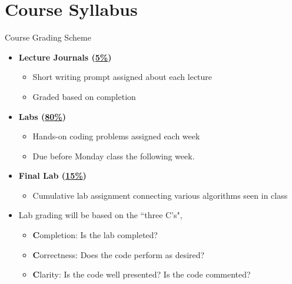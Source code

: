 {}\documentclass[letterpaper,
compress,
xcolor=x11names,
]{beamer}
\begin{document}
\section{Course Syllabus}
\begin{frame}{Course Grading Scheme}
	\footnotesize
	\begin{itemize}
		\item\textbf{Lecture Journals (\underline{5\%})}
			\begin{itemize}
				\item Short writing prompt assigned about each lecture
				\item Graded based on completion
			\end{itemize}
		\item\textbf{Labs (\underline{80\%})}
			\begin{itemize}
				\item Hands-on coding problems assigned each week
				\item Due before Monday class the following week.
			\end{itemize}
		\item\textbf{Final Lab (\underline{15\%})}
			\begin{itemize}
				\item Cumulative lab assignment connecting various algorithms seen in class
			\end{itemize}
		\item Lab grading will be based on the ``three C's", 
			\begin{itemize}
				\item \textbf{C}ompletion: Is the lab completed?
				\item \textbf{C}orrectness: Does the code perform as desired?
				\item \textbf{C}larity: Is the code well presented? Is the code commented?
			\end{itemize}
	\end{itemize}
\end{frame}
\end{document}
